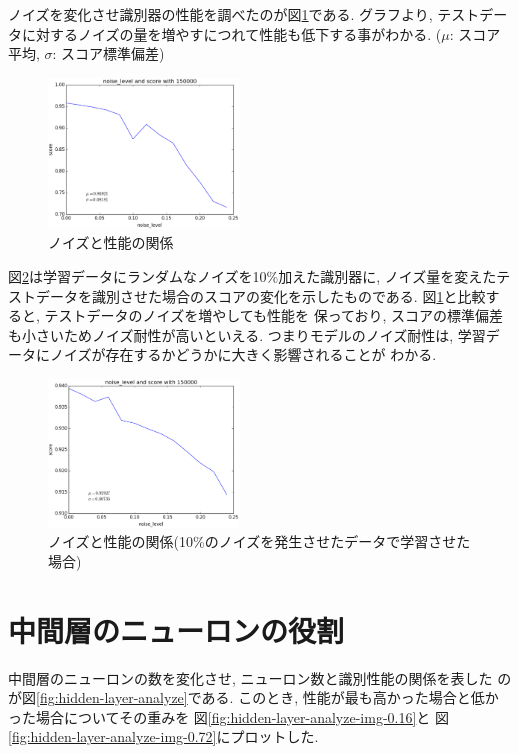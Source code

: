 \documentclass[10pt,a4paper,twocolumn]{jarticle}
\begin{document}
ノイズを変化させ識別器の性能を調べたのが図\ref{fig:noise-level-test-cl0.0}である. 
グラフより, テストデータに対するノイズの量を増やすにつれて性能も低下する事がわかる. 
($\mu$: スコア平均, $\sigma$: スコア標準偏差)
\begin{figure}[htbp]
  \centering
  \includegraphics[width=0.45\textwidth]{assets/img/noise_level_test_mnist_cl0.0.eps}
  \caption{ノイズと性能の関係}
  \label{fig:noise-level-test-cl0.0}
\end{figure}

図\ref{fig:noise-level-test-cl0.1}は学習データにランダムなノイズを10\%加えた識別器に, 
ノイズ量を変えたテストデータを識別させた場合のスコアの変化を示したものである.
図\ref{fig:noise-level-test-cl0.0}と比較すると, テストデータのノイズを増やしても性能を
保っており, スコアの標準偏差も小さいためノイズ耐性が高いといえる. 
つまりモデルのノイズ耐性は, 学習データにノイズが存在するかどうかに大きく影響されることが
わかる.
\begin{figure}[htbp]
  \centering
  \includegraphics[width=0.45\textwidth]{assets/img/noise_level_test_mnist_cl0.1.eps}
  \caption{ノイズと性能の関係(10\%のノイズを発生させたデータで学習させた場合)}
  \label{fig:noise-level-test-cl0.1}
\end{figure}

\section{中間層のニューロンの役割}
中間層のニューロンの数を変化させ, ニューロン数と識別性能の関係を表した
のが図\ref{fig:hidden-layer-analyze}である. 
このとき, 性能が最も高かった場合と低かった場合についてその重みを
図\ref{fig:hidden-layer-analyze-img-0.16}と
図\ref{fig:hidden-layer-analyze-img-0.72}にプロットした. 
\end{document}
